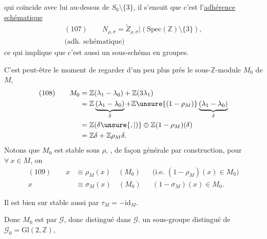 
qui coïncide avec lui au-dessus de $S_0\setminus\{3\}$, il
s'ensuit que c'est l'\uline{adhérence schématique}
\[
\begin{gathered}
(107)\qquad
N_{\rho,\sigma}=\widetilde Z_{\rho,\sigma}|(\mathrm{Spec}(\mathbb Z)\setminus\{3\}),\\
\text{(adh. schématique)}
\end{gathered}
\]
ce qui implique que c'est aussi un sous-schéma en groupes.

C'est peut-être le moment de regarder d'un peu plus près le
sous-$\mathbb Z$-module $M_0$ de $M$,
\[
\begin{aligned}
(108)\qquad M_0
&=\mathbb Z(\lambda_1-\lambda_0)+\mathbb Z(3\lambda_1)\\
&=\mathbb Z\underbrace{(\lambda_1-\lambda_0)}_{\delta}
 +\mathbb Z\unsure{(1-\rho_M)}\underbrace{(\lambda_1-\lambda_0)}_{\delta}\\
&=\mathbb Z(\delta\unsure{,|)}\oplus\mathbb Z(1-\rho_M)(\delta)\\
&=\mathbb Z\delta+\mathbb Z\rho_M\delta.
\end{aligned}
\]
Notons que $M_0$ est stable sous $\rho$, \inserted{$\sigma$}, de façon
générale par construction, pour $\forall\ x\in M$, on
\[
\begin{aligned}
(109)\qquad x&\equiv\rho_M(x)\quad(M_0)
 &&\text{(i.e. }(1-\rho_M)(x)\in M_0\text{)}\\
x&\equiv\sigma_M(x)\quad(M_0)
 &&(1-\sigma_M)(x)\in M_0.
\end{aligned}
\]

Il est bien sur stable aussi par $\tau_M=-\mathrm{id}_M$.

Donc $M_0$ est  par $\mathcal G$, donc
 distingué dans
$\mathcal G$.
 un sous-groupe
distingué de $\mathcal G_0=\mathrm{Gl}(2,\mathbb Z)$,


